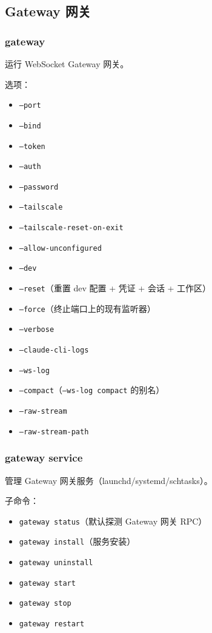 \subsection{Gateway 网关}


\subsubsection{gateway}


运行 WebSocket Gateway 网关。

选项：

\begin{itemize}
  \item \texttt{--port }
  \item \texttt{--bind }
  \item \texttt{--token }
  \item \texttt{--auth }
  \item \texttt{--password }
  \item \texttt{--tailscale }
  \item \texttt{--tailscale-reset-on-exit}
  \item \texttt{--allow-unconfigured}
  \item \texttt{--dev}
  \item \texttt{--reset}（重置 dev 配置 + 凭证 + 会话 + 工作区）
  \item \texttt{--force}（终止端口上的现有监听器）
  \item \texttt{--verbose}
  \item \texttt{--claude-cli-logs}
  \item \texttt{--ws-log }
  \item \texttt{--compact}（\texttt{--ws-log compact} 的别名）
  \item \texttt{--raw-stream}
  \item \texttt{--raw-stream-path }
\end{itemize}


\subsubsection{gateway service}


管理 Gateway 网关服务（launchd/systemd/schtasks）。

子命令：

\begin{itemize}
  \item \texttt{gateway status}（默认探测 Gateway 网关 RPC）
  \item \texttt{gateway install}（服务安装）
  \item \texttt{gateway uninstall}
  \item \texttt{gateway start}
  \item \texttt{gateway stop}
  \item \texttt{gateway restart}
\end{itemize}


